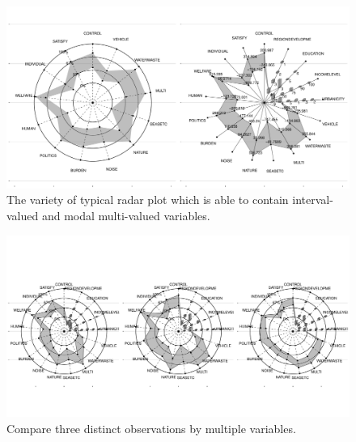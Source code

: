 \documentclass[article]{jss}
\begin{document}
\begin{appendix}
\begin{figure}[t!]
\centering
\includegraphics[width=1\textwidth]{pic/radar_typical} 
\caption{\label{fig:radar_typical} The variety of typical radar plot which is able to contain interval-valued and modal multi-valued variables.}
\end{figure}



\begin{figure}[t!]
\centering
\includegraphics[width=1\textwidth]{pic/radar_3obs} 
\caption{\label{fig:radar_3obs} Compare three distinct observations by multiple variables.}
\end{figure}




\end{appendix}
\end{document}
